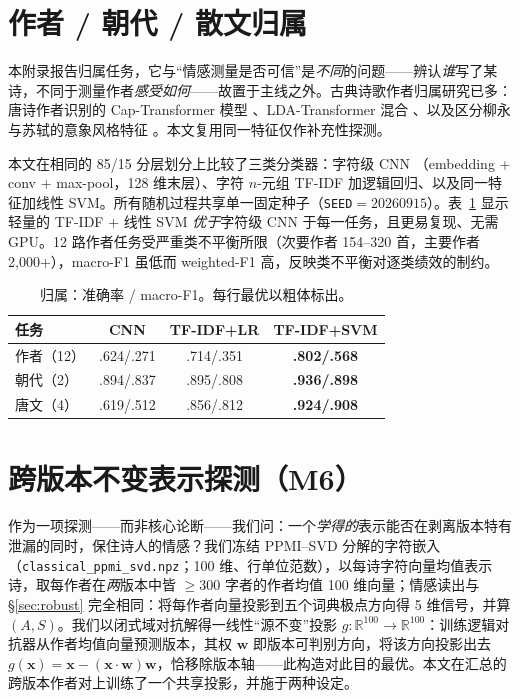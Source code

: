 \documentclass[11pt]{article}
\begin{document}
\section{作者 / 朝代 / 散文归属}
\label{app:attr}
本附录报告归属任务，它与“情感测量是否可信”是\emph{不同}的问题——辨认\emph{谁}写了某诗，不同于测量作者\emph{感受如何}——故置于主线之外。古典诗歌作者归属研究已多：唐诗作者识别的 Cap-Transformer 模型 \citep{shiziren2022}、LDA-Transformer 混合 \citep{zhou2021lda}、以及区分柳永与苏轼的意象风格特征 \citep{fang2011cld}。本文复用同一特征仅作补充性探测。

本文在相同的 85/15 分层划分上比较了三类分类器：字符级 CNN \citep{kim2014convolutional}（embedding + conv + max-pool，128 维末层）、字符 $n$-元组 TF-IDF 加逻辑回归、以及同一特征加线性 SVM。所有随机过程共享单一固定种子（\texttt{SEED}${=}20260915$）。表~\ref{tab:attr} 显示轻量的 TF-IDF + 线性 SVM \emph{优于}字符级 CNN 于每一任务，且更易复现、无需 GPU。12 路作者任务受严重类不平衡所限（次要作者 154–320 首，主要作者 2{,}000+），macro-F1 虽低而 weighted-F1 高，反映类不平衡对逐类绩效的制约。

\begin{table}[H]
\centering\small
\caption{归属：准确率 / macro-F1。每行最优以粗体标出。}
\label{tab:attr}
\begin{tabular}{lccc}
\toprule
任务 & CNN & TF-IDF+LR & TF-IDF+SVM\\
\midrule
作者（12） & .624/.271 & .714/.351 & \textbf{.802/.568}\\
朝代（2） & .894/.837 & .895/.808 & \textbf{.936/.898}\\
唐文（4） & .619/.512 & .856/.812 & \textbf{.924/.908}\\
\bottomrule
\end{tabular}
\end{table}

\section{跨版本不变表示探测（M6）}
\label{app:m6}
作为一项探测——而非核心论断——我们问：一个\emph{学得的}表示能否在剥离版本特有泄漏的同时，保住诗人的情感？我们冻结 PPMI–SVD 分解的字符嵌入（\texttt{classical\_ppmi\_svd.npz}；100 维、行单位范数），以每诗字符向量均值表示诗，取每作者在\emph{两}版本中皆 $\ge$300 字者的作者均值 100 维向量；情感读出与 \S\ref{sec:robust} 完全相同：将每作者向量投影到五个词典极点方向得 5 维信号，并算 $(A,S)$。我们以闭式域对抗解得一线性“源不变”投影 $g:\mathbb{R}^{100}\!\to\!\mathbb{R}^{100}$：训练逻辑对抗器从作者均值向量预测版本，其权 $\mathbf w$ 即版本可判别方向，将该方向投影出去
$g(\mathbf x)=\mathbf x-(\mathbf x\!\cdot\!\mathbf w)\mathbf w$，恰移除版本轴——此构造对此目的最优。本文在汇总的跨版本作者对上训练了一个共享投影，并施于两种设定。
\end{document}
